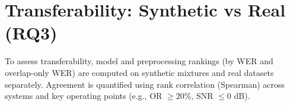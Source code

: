 \section{Transferability: Synthetic vs Real (RQ3)}
To assess transferability, model and preprocessing rankings (by WER and overlap-only WER)
are computed on synthetic mixtures and real datasets separately. Agreement is quantified using
rank correlation (Spearman) across systems and key operating points (e.g., OR $\ge 20\%$, SNR $\le 0$ dB).